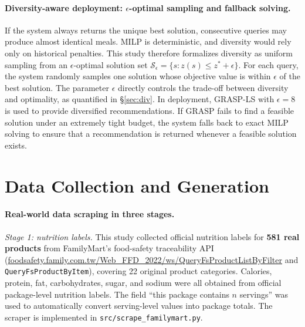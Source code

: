 \documentclass[a4paper]{article}
\begin{document}
\paragraph{Diversity-aware deployment: $\epsilon$-optimal sampling and fallback solving.}\label{par:eps}
If the system always returns the unique best solution, consecutive queries may produce almost identical meals. MILP is deterministic, and diversity would rely only on historical penalties. This study therefore formalizes diversity as uniform sampling from an $\epsilon$-optimal solution set $\mathcal{S}_\epsilon=\{s : z(s)\le z^*+\epsilon\}$. For each query, the system randomly samples one solution whose objective value is within $\epsilon$ of the best solution. The parameter $\epsilon$ directly controls the trade-off between diversity and optimality, as quantified in \S\ref{sec:div}. In deployment, GRASP-LS with $\epsilon=8$ is used to provide diversified recommendations. If GRASP fails to find a feasible solution under an extremely tight budget, the system falls back to exact MILP solving to ensure that a recommendation is returned whenever a feasible solution exists.

\section{Data Collection and Generation}\label{sec:data}
\paragraph{Real-world data scraping in three stages.}

\textit{Stage 1: nutrition labels.} This study collected official nutrition labels for \textbf{581 real products} from FamilyMart's food-safety traceability API (\url{foodsafety.family.com.tw/Web_FFD_2022/ws/QueryFsProductListByFilter} and \texttt{QueryFsProductByItem}), covering 22 original product categories. Calories, protein, fat, carbohydrates, sugar, and sodium were all obtained from official package-level nutrition labels. The field ``this package contains $n$ servings'' was used to automatically convert serving-level values into package totals. The scraper is implemented in \texttt{src/scrape\_familymart.py}.
\end{document}
